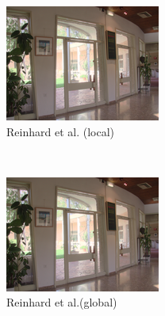 \begin{figure}
\begin{subfigure}[b]{0.33\textwidth}
    \includegraphics[width=\textwidth]{figures/chapter2/tmos44/44_reinhard02.png}
    \caption{Reinhard et al. (local) ~\cite{reinhard2002photographic}}
\end{subfigure}\\
\begin{subfigure}[b]{0.33\textwidth}
   \centering
    \includegraphics[width=\textwidth]{figures/chapter2/tmos44/44_reinhard02_global.png}
    \caption{Reinhard et al.(global) ~\cite{reinhard2002photographic}}
\end{subfigure}\hfill
\begin{subfigure}[b]{0.33\textwidth}
    \centering

\end{subfigure}
\end{figure}
